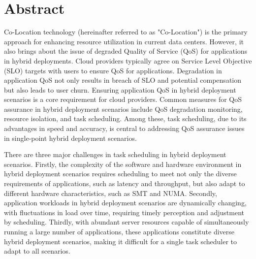\intobmk\chapter*{Abstract}%


Co-Location technology (hereinafter referred to as "Co-Location") is the primary approach for enhancing resource utilization in current data centers. However, it also brings about the issue of degraded Quality of Service (QoS) for applications in hybrid deployments. Cloud providers typically agree on Service Level Objective (SLO) targets with users to ensure QoS for applications. Degradation in application QoS not only results in breach of SLO and potential compensation but also leads to user churn. Ensuring application QoS in hybrid deployment scenarios is a core requirement for cloud providers. Common measures for QoS assurance in hybrid deployment scenarios include QoS degradation monitoring, resource isolation, and task scheduling. Among these, task scheduling, due to its advantages in speed and accuracy, is central to addressing QoS assurance issues in single-point hybrid deployment scenarios.

There are three major challenges in task scheduling in hybrid deployment scenarios. Firstly, the complexity of the software and hardware environment in hybrid deployment scenarios requires scheduling to meet not only the diverse requirements of applications, such as latency and throughput, but also adapt to different hardware characteristics, such as SMT and NUMA. Secondly, application workloads in hybrid deployment scenarios are dynamically changing, with fluctuations in load over time, requiring timely perception and adjustment by scheduling. Thirdly, with abundant server resources capable of simultaneously running a large number of applications, these applications constitute diverse hybrid deployment scenarios, making it difficult for a single task scheduler to adapt to all scenarios.

